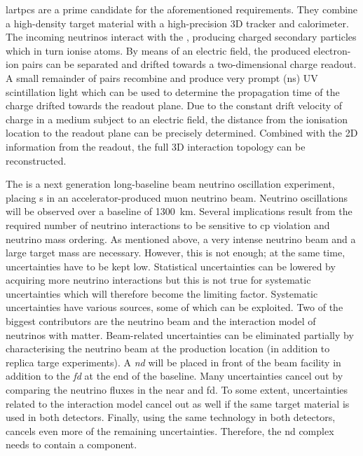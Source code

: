 \glspl{lartpc} are a prime candidate for the aforementioned requirements.
They combine a high-density target material with a high-precision 3D tracker and calorimeter.
The incoming neutrinos interact with the \lar{}, producing charged secondary particles which in turn ionise  atoms.
By means of an electric field, the produced electron-ion pairs can be separated and drifted towards a two-dimensional charge readout.
A small remainder of pairs recombine and produce very prompt (\si{\nano\second}) UV scintillation light which can be used to determine the propagation time of the charge drifted towards the readout plane.
Due to the constant drift velocity of charge in a medium subject to an electric field, the distance from the ionisation location to the readout plane can be precisely determined.
Combined with the 2D information from the readout, the full 3D interaction topology can be reconstructed.

The \dune{} is a next generation long-baseline beam neutrino oscillation experiment, placing \lartpc{}s in an accelerator-produced muon neutrino beam.
Neutrino oscillations will be observed over a baseline of \SI{1300}{\kilo\metre}.
Several implications result from the required number of neutrino interactions to be sensitive to \gls{cp} violation and neutrino mass ordering.
As mentioned above, a very intense neutrino beam and a large target mass are necessary.
However, this is not enough; at the same time, uncertainties have to be kept low.
Statistical uncertainties can be lowered by acquiring more neutrino interactions but this is not true for systematic uncertainties which will therefore become the limiting factor.
Systematic uncertainties have various sources, some of which can be exploited.
Two of the biggest contributors are the neutrino beam and the interaction model of neutrinos with matter.
Beam-related uncertainties can be eliminated partially by characterising the neutrino beam at the production location (in addition to replica targe experiments).
A \emph{\gls{nd}} will be placed in front of the beam facility in addition to the \emph{\gls{fd}} at the end of the baseline.
Many uncertainties cancel out by comparing the neutrino fluxes in the near and \gls{fd}.
To some extent, uncertainties related to the interaction model cancel out as well if the same target material is used in both detectors.
Finally, using the same technology in both detectors, cancels even more of the remaining uncertainties.
Therefore, the \gls{nd} complex needs to contain a \lartpc{} component.

